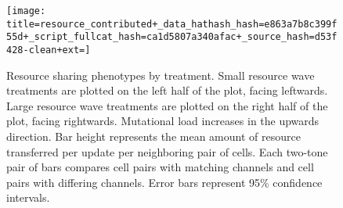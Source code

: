 \begin{figure}[!htbp]
\begin{center}

\texttt{[image: title=resource\_contributed+\_data\_hathash\_hash=e863a7b8c399f55d+\_script\_fullcat\_hash=ca1d5807a340afac+\_source\_hash=d53f428-clean+ext=]}

\caption{
Resource sharing phenotypes by treatment.
Small resource wave treatments are plotted on the left half of the plot, facing leftwards.
Large resource wave treatments are plotted on the right half of the plot, facing rightwards.
Mutational load increases in the upwards direction.
Bar height represents the mean amount of resource transferred per update per neighboring pair of cells.
Each two-tone pair of bars compares cell pairs with matching channels and cell pairs with differing channels.
Error bars represent 95\% confidence intervals.
} \label{fig:resource_contributed}
\end{center}
\end{figure}
